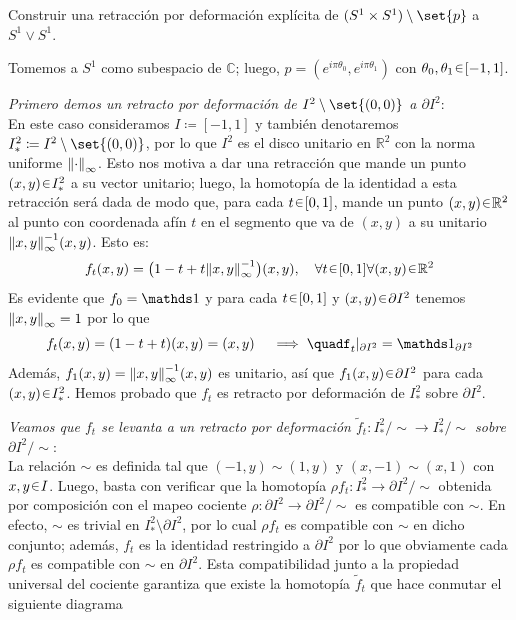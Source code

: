 \begin{ejer}
Construir una retracción por deformación explícita de $(S^1 \times S^1)\setminus\set{p}$ a $S^1 \lor S^1$.
\end{ejer}
\begin{sol}
Tomemos a $S^1$ como subespacio de $\mathbb{C}$; luego, $p = (e^{i\pi\theta_0},e^{i\pi\theta_1})$ con $\theta_0,\theta_1 \en [-1,1]$.\par\vspace{1em}
\emph{Primero demos un retracto por deformación de $I^2\setminus\set{(0,0)}$ a $\partial I^2$}:\\
En este caso consideramos $I \coloneq [-1,1]$ y también denotaremos $I^2_* \coloneq I^2\setminus\set{(0,0)}$, por lo que $I^2$ es el disco unitario en $\mathbb{R}^2$ con la norma uniforme $\norm{\cdot}_{\infty}$. Esto nos motiva a dar una retracción que mande un punto $(x,y) \en I^2_*$ a su vector unitario; luego, la homotopía de la identidad a esta retracción será dada de modo que, para cada $t\en [0,1]$, mande un punto $(x,y) \en \mathbb{R}^2$ al punto con coordenada afín $t$ en el segmento que va de $(x,y)$ a su unitario $\norm{x,y}_{\infty}^{-1}(x,y)$. Esto es:
\[
f_t(x,y) = \big(%
    1-t + t\norm{x,y}_{\infty}^{-1}
\big)
(x,y),%
\quad\forall t\en[0,1] \forall(x,y)\en\mathbb{R}^2
\]
Es evidente que $f_0 = \id$ y para cada $t \en [0,1]$ y $(x,y) \en \partial I^2$ tenemos $\norm{x,y}_{\infty} = 1$ por lo que 
\[
f_t(x,y) = (1-t+t)(x,y) = (x,y)%
\quad\implies\quad%
f_t|_{\partial I^2} = \id_{\partial I^2}
\]
Además, $f_1(x,y) = \norm{x,y}^{-1}_\infty(x,y)$ es unitario, así que $f_1(x,y) \en \partial I^2$ para cada $(x,y) \en I^2_*$. Hemos probado que $f_t$ es retracto por deformación de $I^2_*$ sobre $\partial I^2$.\par\vspace{1em}
\emph{Veamos que $f_t$ se levanta a un retracto por deformación $\tilde{f}_t \colon I^2_*/{\sim} \to I^2_*/{\sim}$ sobre $\partial I^2/{\sim}$}:\\
La relación $\sim$ es definida tal que $(-1,y) \sim (1,y)$ y $(x,-1) \sim (x,1)$ con $x,y \en I$. Luego, basta con verificar que la homotopía $\rho f_t \colon I^2_* \to \partial I^2/{\sim}$ obtenida por composición con el mapeo cociente $\rho \colon \partial I^2 \to \partial I^2/{\sim}$ es compatible con $\sim$. En efecto, $\sim$ es trivial en $I^2_* \setminus \partial I^2$, por lo cual $\rho f_t$ es compatible con $\sim$ en dicho conjunto; además, $f_t$ es la identidad restringido a $\partial I^2$ por lo que obviamente cada $\rho f_t$ es compatible con $\sim$ en $\partial I^2$. Esta compatibilidad junto a la propiedad universal del cociente garantiza que existe la homotopía $\tilde{f}_t$ que hace conmutar el siguiente diagrama

\end{sol}
